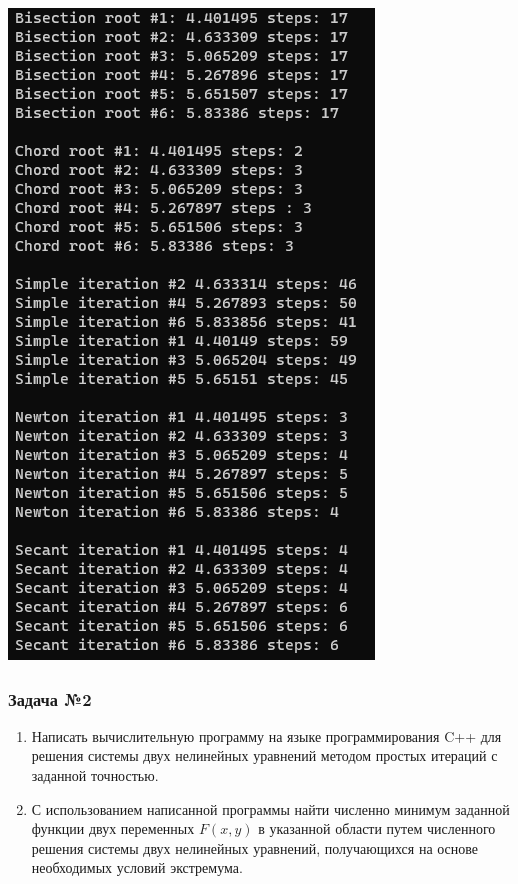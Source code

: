 \documentclass[a4paper, fontsize=14pt]{article}
\begin{document}
\begin{center}
\includegraphics{src/result_1.png}
    \label{fig:result1}
\end{center}

\subsubsection*{Задача №2}
\begin{enumerate}
    \item Написать вычислительную программу на языке программирования C++ для решения системы двух нелинейных уравнений методом простых итераций с заданной точностью.
    \item С использованием написанной программы найти численно минимум
    заданной функции двух переменных $F(x,y)$ в указанной области путем
    численного решения системы двух нелинейных уравнений, получающихся
    на основе необходимых условий экстремума.
\end{enumerate}
\end{document}
